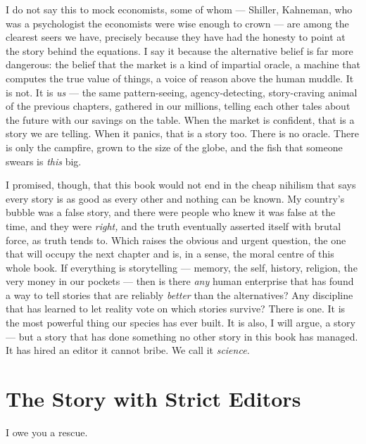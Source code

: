 I do not say this to mock economists, some of whom — Shiller, Kahneman, who was a psychologist the economists were wise enough to crown — are among the clearest seers we have, precisely because they have had the honesty to point at the story behind the equations. I say it because the alternative belief is far more dangerous: the belief that the market is a kind of impartial oracle, a machine that computes the true value of things, a voice of reason above the human muddle. It is not. It is \emph{us} — the same pattern-seeing, agency-detecting, story-craving animal of the previous chapters, gathered in our millions, telling each other tales about the future with our savings on the table. When the market is confident, that is a story we are telling. When it panics, that is a story too. There is no oracle. There is only the campfire, grown to the size of the globe, and the fish that someone swears is \emph{this} big.

I promised, though, that this book would not end in the cheap nihilism that says every story is as good as every other and nothing can be known. My country's bubble was a false story, and there were people who knew it was false at the time, and they were \emph{right,} and the truth eventually asserted itself with brutal force, as truth tends to. Which raises the obvious and urgent question, the one that will occupy the next chapter and is, in a sense, the moral centre of this whole book. If everything is storytelling — memory, the self, history, religion, the very money in our pockets — then is there \emph{any} human enterprise that has found a way to tell stories that are reliably \emph{better} than the alternatives? Any discipline that has learned to let reality vote on which stories survive? There is one. It is the most powerful thing our species has ever built. It is also, I will argue, a story — but a story that has done something no other story in this book has managed. It has hired an editor it cannot bribe. We call it \emph{science.}

\chapter{The Story with Strict Editors}

I owe you a rescue.

